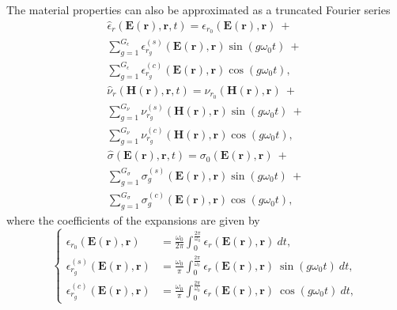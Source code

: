 The material properties can also be approximated as a truncated Fourier series \cite{copeland2010domain}
%
\begin{multline} \label{eq:matfourier}
\hat{{\epsilon}}_r(\mathbf{E}(\mathbf{r}), \mathbf{r}, t) = {\epsilon}_{r_0}(\mathbf{E}(\mathbf{r}),\mathbf{r}) \ + \\
\sum^{G_\epsilon}_{g=1} {\epsilon}_{r_g}^{(s)}(\mathbf{E}(\mathbf{r}),\mathbf{r}) \sin(g \omega_0 t) \ + \ \\ \sum^{G_\epsilon}_{g=1}  {\epsilon}_{r_g}^{(c)}(\mathbf{E}(\mathbf{r}),\mathbf{r}) \cos(g \omega_0 t),
\end{multline} 
\begin{multline} 
\hat{{\nu}}_r(\mathbf{H}(\mathbf{r}), \mathbf{r}, t) = {\nu}_{r_0}(\mathbf{H}(\mathbf{r}),\mathbf{r}) \ + \\ \sum^{G_\nu}_{g=1}  {\nu}_{r_g}^{(s)}(\mathbf{H}(\mathbf{r}),\mathbf{r}) \sin(g \omega_0 t) \ + \\
 \sum^{G_\nu}_{g=1} {\nu}_{r_g}^{(c)}(\mathbf{H}(\mathbf{r}),\mathbf{r}) \cos(g \omega_0 t),
\end{multline} 
\begin{multline} 
\hat{{\sigma}}(\mathbf{E}(\mathbf{r}), \mathbf{r}, t) = {\sigma}_{0}(\mathbf{E}(\mathbf{r}),\mathbf{r}) \ + \\
\sum^{G_\sigma}_{g=1} {\sigma}_{g}^{(s)}(\mathbf{E}(\mathbf{r}),\mathbf{r}) \sin(g \omega_0 t) \ + \\
\sum^{G_\sigma}_{g=1} {\sigma}_{g}^{(c)} (\mathbf{E}(\mathbf{r}),\mathbf{r}) \cos(g \omega_0 t),
\end{multline}
where the coefficients of the expansions are given by
\begin{equation}
\left\{
\begin{aligned} \label{eq:epsCoeffs}
{\epsilon}_{r_{0}}(\mathbf{E}(\mathbf{r}),\mathbf{r}) &= \frac{\omega_0}{2\pi}\int_0^{\frac{2\pi}{\omega_0}}
{\epsilon}_r(\mathbf{E}(\mathbf{r}),\mathbf{r}) \ dt, \\[.5cm]
{\epsilon}_{r_{g}}^{(s)}(\mathbf{E}(\mathbf{r}),\mathbf{r}) &=  \frac{\omega_0}{\pi}\int_0^{\frac{2\pi}{\omega_0}}
{\epsilon}_r(\mathbf{E}(\mathbf{r}),\mathbf{r}) \ \sin(g \omega_0 t) \ dt, \\[.5cm]
{\epsilon}_{r_{g}}^{(c)}(\mathbf{E}(\mathbf{r}),\mathbf{r}) &=  \frac{\omega_0}{\pi}\int_0^{\frac{2\pi}{\omega_0}} 
{\epsilon}_r(\mathbf{E}(\mathbf{r}),\mathbf{r}) \ \cos(g \omega_0 t) \ dt,
\end{aligned}
\right.
\end{equation}
